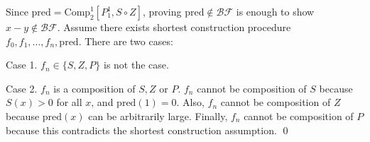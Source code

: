 \begin{pf} \rm
Since $\mathrm{pred} = \mathrm{Comp}^1_2[P_1^1, S\circ Z]$, proving $\mathrm{pred}\notin
\mathcal{BF}$ is enough to show $x-y\notin\mathcal{BF}$.
Assume there exists shortest construction procedure
$f_0, f_1, \ldots, f_n, \mathrm{pred}$. There are two cases:

Case 1. $f_n\in\{S,Z,P\}$ is not the case.

Case 2. $f_n$ is a composition of $S,Z$ or $P$. $f_n$ cannot be composition of $S$ because
$S(x)>0$ for all $x$, and $\mathrm{pred}(1)=0$. Also, $f_n$ cannot be composition of 
$Z$ because $\mathrm{pred}(x)$
can be arbitrarily large. Finally, $f_n$ cannot be composition of $P$ because this contradicts
the shortest construction assumption. \qed

\end{pf}

